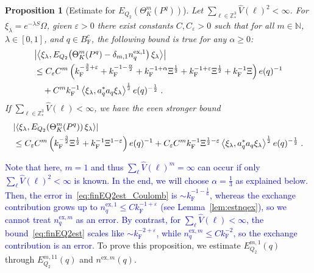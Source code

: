 \documentclass[12pt,a4paper]{article}
\numberwithin{equation}{section}
\newcommand{\NNN}{\mathbb{N}}
\newcommand{\1}{\mathbb{I}}
\newcommand{\ex}{\mathrm{ex}}
\newcommand{\F}{\mathrm{F}}
\newcommand{\Z}{\mathbb{Z}}
\newcommand{\half}{\frac{1}{2}}
\newcommand{\eva}[1]{\left\langle #1 \right\rangle}
\theoremstyle{plain}
\newtheorem{proposition}[theorem]{Proposition}
\theoremstyle{definition}
\theoremstyle{remark}
\theoremstyle{plain}
\theoremstyle{definition}
\theoremstyle{remark}
\begin{document}
\begin{proposition}[Estimate for $E_{Q_2}(\Theta^m_{K}(P^q))$]\label{prop:finEQ2est}
Let $ \sum_{\ell \in \Z^3_*} \hat{V}(\ell)^2 < \infty $. For $\xi_\lambda = e^{-\lambda S} \Omega$, given $ \varepsilon > 0 $ there exist constants $ C, C_\varepsilon > 0 $ such that for all $ m \in \NNN $, $ \lambda \in [0,1] $, and $ q \in B_{\F}^c $, the following bound is true for any $ \alpha \ge 0 $:
\begin{align}\label{eq:finEQ2est_Coulomb}
	&\abs{\eva{\xi_\lambda, E_{Q_2}\!\left(\Theta^m_K(P^q)- \delta_{m,1} n_q^{\ex,1} \right) \xi_\lambda}} \nonumber\\
	&\leq C_\varepsilon C^m \left( k_{\F}^{-\frac 32 + \varepsilon} 
		+ k_{\F}^{-1 - \frac{\alpha}{2}} 
		+ k_{\F}^{-1+\alpha} \Xi^\half
		+ k_{\F}^{-1+\varepsilon} \Xi^\half
		+ k_{\F}^{-1} \Xi \right) e(q)^{-1} \nonumber\\
	&\quad + C^m k_{\F}^{-1} \eva{\xi_\lambda, a_q^* a_q \xi_\lambda}^{\half} e(q)^{-\half}  \;.
\end{align}
If $ \sum_{\ell \in \Z^3_*} \hat{V}(\ell) < \infty $, we have the even stronger bound
\begin{align}\label{eq:finEQ2est}
	&\abs{\eva{\xi_\lambda, E_{Q_2}\!\left(\Theta^m_K(P^q)\right) \xi_\lambda}} \nonumber\\
	&\leq C_\varepsilon C^m \left( k_{\F}^{-\frac{3}{2}} \Xi^\half
		+ k_{\F}^{-1} \Xi^{1-\varepsilon} \right) e(q)^{-1} 
		+ C_\varepsilon C^m k_{\F}^{-1} \Xi^{\half - \varepsilon} \eva{\xi_\lambda, a_q^* a_q \xi_\lambda}^{\half} e(q)^{-\half} \;. \\
\end{align}
\end{proposition}

\textcolor{blue}{
Note that here, $ m = 1 $ and thus $ \sum_\ell \hat{V}(\ell)^m = \infty $ can occur if only $ \sum_\ell \hat{V}(\ell)^2 < \infty $ is known. In the end, we will choose $ \alpha = \frac 13 $ as explained below. Then, the error in~\eqref{eq:finEQ2est_Coulomb} is $ \sim k_{\F}^{-1-\frac 16} $, whereas the exchange contribution grows up to $ n_q^{\ex,1} \le C k_{\F}^{-1 + \varepsilon} $ (see Lemma~\ref{lem:estnqex}), so we cannot treat $ n_q^{\ex,m} $ as an error. By contrast, for $ \sum_\ell \hat{V}(\ell) < \infty $, the bound~\eqref{eq:finEQ2est} scales like $ \sim k_{\F}^{-2+\varepsilon} $, while $ n_q^{\ex,m} \le C k_{\F}^{-2} $, so the exchange contribution is an error.
}
To prove this proposition, we estimate $ E^{m,1}_{Q_2}(q) $ through $ E^{m,11}_{Q_2} (q)$ and $ n^{\ex,m}(q) $.
\end{document}
